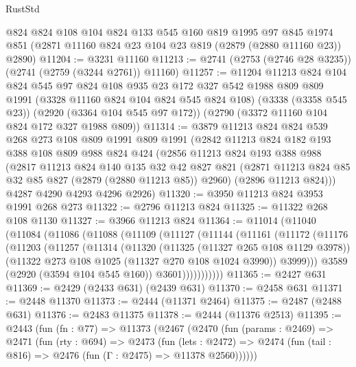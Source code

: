 \begin{lexlean}{RustStd}
\begin{coremodule}
    @824
    @824
    @108
    @104
    @824
    @133
    @545
    @160
    @819
    @1995
    @97
    @845
    @1974
    @851
    (@2871 @11160 @824 @23 @104 @23 @819 (@2879 (@2880 @11160 @23)) @2890)
@11204 := @3231 @11160
@11213 := @2741 (@2753 (@2746 @28 @3235)) (@2741 (@2759 (@3244 @2761)) @11160)
@11257 := @11204
    @11213
    @824
    @104
    @824
    @545
    @97
    @824
    @108
    @935
    @23
    @172
    @327
    @542
    @1988
    @809
    @809
    @1991
    (@3328 @11160 @824 @104 @824 @545 @824 @108)
    (@3338 (@3358 @545 @23))
    (@2920 (@3364 @104 @545 @97 @172))
    (@2790 (@3372 @11160 @104 @824 @172 @327 @1988 @809))
@11314 := @3879
    @11213
    @824
    @824
    @539
    @268
    @273
    @108
    @809
    @1991
    @809
    @1991
    (@2842
      @11213
      @824
      @182
      @193
      @388
      @108
      @809
      @988
      @824
      @424
      (@2856
        @11213
        @824
        @193
        @388
        @988
        (@2817
          @11213
          @824
          @140
          @135
          @32
          @42
          @827
          @821
          (@2871 @11213 @824 @85 @32 @85 @827 (@2879 (@2880 @11213 @85)) @2960)
          (@2896 @11213 @824)))
      @4287
      @4290
      @4293
      @4296
      @2926)
@11320 := @3950 @11213 @824 @3953 @1991 @268 @273
@11322 := @2796 @11213 @824
@11325 := @11322 @268 @108 @1130
@11327 := @3966 @11213 @824
@11364 := @11014
    (@11040
      (@11084
        (@11086
          (@11088
            (@11109
              (@11127
                (@11144
                  (@11161
                    (@11172
                      (@11176
                        (@11203
                          (@11257
                            (@11314
                              (@11320
                                (@11325 (@11327 @265 @108 @1129 @3978))
                                (@11322 @273 @108 @1025 (@11327 @270 @108 @1024 @3990))
                                @3999)))
                          @3589
                          (@2920 (@3594 @104 @545 @160))
                          @3601)))))))))))
@11365 := @2427 @631
@11369 := @2429 (@2433 @631) (@2439 @631)
@11370 := @2458 @631
@11371 := @2448 @11370
@11373 := @2444 (@11371 @2464)
@11375 := @2487 (@2488 @631)
@11376 := @2483 @11375
@11378 := @2444 (@11376 @2513)
@11395 := @2443
    (fun (fn : @77) =>
    @11373
      (@2467
        (@2470
          (fun (params : @2469) =>
          @2471
            (fun (rty : @694) =>
            @2473
              (fun (lets : @2472) =>
              @2474 (fun (tail : @816) => @2476 (fun (Γ : @2475) => @11378 @2560))))))

\end{coremodule}
\end{lexlean}
